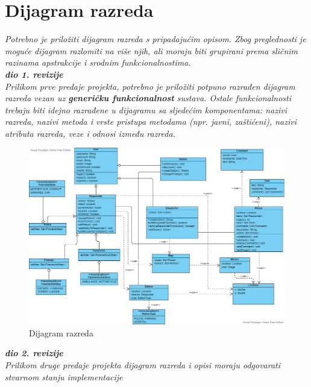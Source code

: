 			\eject
			
			
		\section{Dijagram razreda}
		
			\textit{Potrebno je priložiti dijagram razreda s pripadajućim opisom. Zbog preglednosti je moguće dijagram razlomiti na više njih, ali moraju biti grupirani prema sličnim razinama apstrakcije i srodnim funkcionalnostima.}\\
			
			\textbf{\textit{dio 1. revizije}}\\
		
			\textit{Prilikom prve predaje projekta, potrebno je priložiti potpuno razrađen dijagram razreda vezan uz \textbf{generičku funkcionalnost} sustava. Ostale funkcionalnosti trebaju biti idejno razrađene u dijagramu sa sljedećim komponentama: nazivi razreda, nazivi metoda i vrste pristupa metodama (npr. javni, zaštićeni), nazivi atributa razreda, veze i odnosi između razreda.}\\
			
			\begin{figure}[H]
				\includegraphics[scale=0.4]{slike/classes.PNG}
				\centering
				\caption{Dijagram razreda}
				\label{fig:razredi}
			\end{figure}
			
			\textbf{\textit{dio 2. revizije}}\\			
			
			\textit{Prilikom druge predaje projekta dijagram razreda i opisi moraju odgovarati stvarnom stanju implementacije}
			
